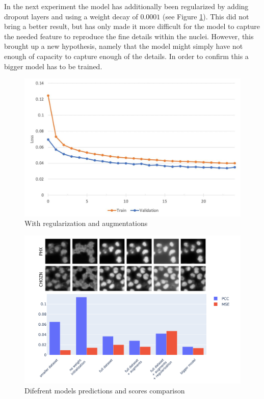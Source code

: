 In the next experiment the model has additionally been regularized by adding dropout layers and using a weight decay of $0.0001$ (see Figure \ref{fig:full-dataset-pcc-regularized}). This did not bring a better result, but has only made it more difficult for the model to capture the needed feature to reproduce the fine details within the nuclei. However, this brought up a new hypothesis, namely that the model might simply have not enough of capacity to capture enough of the details. In order to confirm this a bigger model has to be trained.
\begin{figure}[H]
	\begin{center}
		\includegraphics[width=0.5\linewidth]{bilder/nuclei/full-dataset-regularized.jpg}
		\caption{With regularization and augmentations}\label{fig:full-dataset-pcc-regularized}
	\end{center}
\end{figure}

\begin{figure}[H]
	\begin{center}
		\includegraphics[width=0.5\linewidth]{bilder/nuclei/comparison-chzn-phx.png}
		\caption{Difefrent models predictions and scores comparison}\label{fig:nuclei-comparison-predictions}
	\end{center}
\end{figure}

